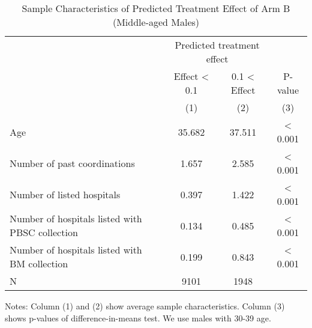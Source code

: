 \documentclass[
]{article}
\begin{document}
\begin{table}[H]

\caption{\label{tab:rcf-middle-male}Sample Characteristics of Predicted Treatment Effect of Arm B (Middle-aged Males)}
\centering
\fontsize{9}{11}\selectfont
\fontsize{9}{11}\selectfont
\begin{threeparttable}
\begin{tabular}[t]{lccc}
\toprule
\multicolumn{1}{c}{ } & \multicolumn{2}{c}{Predicted treatment effect} & \multicolumn{1}{c}{ } \\
\cmidrule(l{3pt}r{3pt}){2-3}
\multicolumn{1}{c}{ } & \multicolumn{1}{c}{Effect < 0.1} & \multicolumn{1}{c}{0.1 < Effect} & \multicolumn{1}{c}{P-value} \\
\cmidrule(l{3pt}r{3pt}){2-2} \cmidrule(l{3pt}r{3pt}){3-3} \cmidrule(l{3pt}r{3pt}){4-4}
 & (1) & (2) & (3)\\
\midrule
Age & 35.682 & 37.511 & < 0.001\\
Number of past coordinations & 1.657 & 2.585 & < 0.001\\
Number of listed hospitals & 0.397 & 1.422 & < 0.001\\
Number of hospitals listed with PBSC collection & 0.134 & 0.485 & < 0.001\\
Number of hospitals listed with BM collection & 0.199 & 0.843 & < 0.001\\
N & 9101 & 1948 & \\
\bottomrule
\end{tabular}
\begin{tablenotes}
\item Notes: Column (1) and (2) show average sample characteristics. Column (3) shows p-values of difference-in-means test. We use males with 30-39 age.
\end{tablenotes}
\end{threeparttable}
\end{table}
\end{document}
